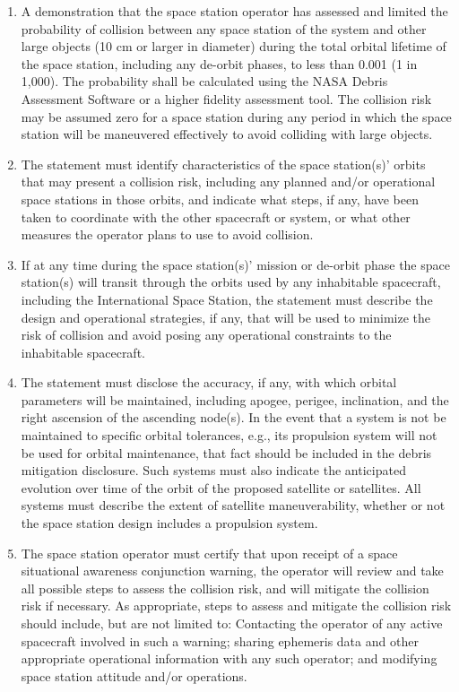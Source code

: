 \documentclass[
  letterpaper,
  DIV=11,
  numbers=noendperiod]{scrreport}
\begin{document}
\begin{enumerate}
\def\labelenumi{(\arabic{enumi})}
\item
  A demonstration that the space station operator has assessed and
  limited the probability of collision between any space station of the
  system and other large objects (10 cm or larger in diameter) during
  the total orbital lifetime of the space station, including any
  de-orbit phases, to less than 0.001 (1 in 1,000). The probability
  shall be calculated using the NASA Debris Assessment Software or a
  higher fidelity assessment tool. The collision risk may be assumed
  zero for a space station during any period in which the space station
  will be maneuvered effectively to avoid colliding with large objects.
\item
  The statement must identify characteristics of the space station(s)'
  orbits that may present a collision risk, including any planned and/or
  operational space stations in those orbits, and indicate what steps,
  if any, have been taken to coordinate with the other spacecraft or
  system, or what other measures the operator plans to use to avoid
  collision.
\item
  If at any time during the space station(s)' mission or de-orbit phase
  the space station(s) will transit through the orbits used by any
  inhabitable spacecraft, including the International Space Station, the
  statement must describe the design and operational strategies, if any,
  that will be used to minimize the risk of collision and avoid posing
  any operational constraints to the inhabitable spacecraft.
\item
  The statement must disclose the accuracy, if any, with which orbital
  parameters will be maintained, including apogee, perigee, inclination,
  and the right ascension of the ascending node(s). In the event that a
  system is not be maintained to specific orbital tolerances, e.g., its
  propulsion system will not be used for orbital maintenance, that fact
  should be included in the debris mitigation disclosure. Such systems
  must also indicate the anticipated evolution over time of the orbit of
  the proposed satellite or satellites. All systems must describe the
  extent of satellite maneuverability, whether or not the space station
  design includes a propulsion system.
\item
  The space station operator must certify that upon receipt of a space
  situational awareness conjunction warning, the operator will review
  and take all possible steps to assess the collision risk, and will
  mitigate the collision risk if necessary. As appropriate, steps to
  assess and mitigate the collision risk should include, but are not
  limited to: Contacting the operator of any active spacecraft involved
  in such a warning; sharing ephemeris data and other appropriate
  operational information with any such operator; and modifying space
  station attitude and/or operations.
\end{enumerate}
\end{document}

